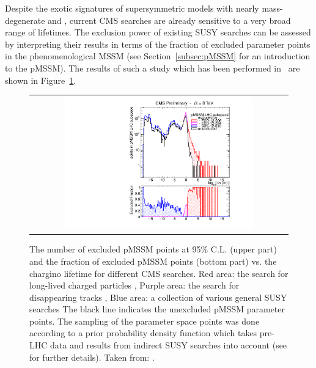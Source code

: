 
Despite the exotic signatures of supersymmetric models with nearly mass-degenerate \chipm and \chiO, current CMS searches are already sensitive to a very broad range of lifetimes.
The exclusion power of existing SUSY searches can be assessed by interpreting their results in terms of the fraction of excluded parameter points in the phenomenological MSSM (see Section~\ref{subsec:pMSSM} for an introduction to the pMSSM). 
The results of such a study which has been performed in~\cite{bib:CMS:DT_8TeV} are shown in Figure~\ref{fig:pMSSMplot}. 
\begin{figure}[!t]
\vspace{20pt}
  \centering 
  \begin{tabular}{c}
    \includegraphics[width=0.75\textwidth]{figures/analysis/pMSSM_vs_ctau.pdf}
  \end{tabular}
  \caption{The number of excluded pMSSM points at 95\% C.L. (upper part) and the fraction of excluded pMSSM points (bottom part) vs. the chargino lifetime for different CMS searches.
           Red area: the search for long-lived charged particles \cite{bib:CMS:HSCP_8TeV},
           Purple area: the search for disappearing tracks  \cite{bib:CMS:DT_8TeV},
           Blue area: a collection of various general SUSY searches \cite{bib:CMS:pMSSMinterpretation_7TeV_PAS}
           The black line indicates the unexcluded pMSSM parameter points.
           The sampling of the parameter space points was done according to a prior probability density function which takes pre-LHC data and results from indirect SUSY searches into account (see \cite{bib:CMS:HSCPReinterpreation_PAS} for further details).
           Taken from: \cite{bib:pMSSMplot_source_from_DT}.}
  \label{fig:pMSSMplot}
\vspace{20pt}
\end{figure}
